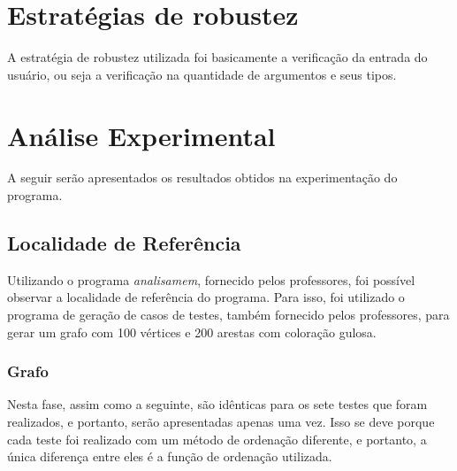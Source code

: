 \documentclass{article}
\begin{document}
\section{Estratégias de robustez}

A estratégia de robustez utilizada foi basicamente a verificação da entrada do usuário, ou seja a verificação na quantidade de argumentos e seus tipos.

\section{Análise Experimental}

A seguir serão apresentados os resultados obtidos na experimentação do programa.

\subsection{Localidade de Referência}

Utilizando o programa \emph{analisamem}, fornecido pelos professores, foi possível observar a localidade de referência do programa. 
Para isso, foi utilizado o programa de geração de casos de testes, também fornecido pelos professores, para gerar um grafo com 100 vértices e 200 arestas com coloração gulosa.

\subsubsection{Grafo }
Nesta fase, assim como a seguinte, são idênticas para os sete testes que foram realizados, e portanto, serão apresentadas apenas uma vez. Isso se deve porque cada teste foi realizado com um método de ordenação diferente, e portanto, a única diferença entre eles é a função de ordenação utilizada.
\end{document}
